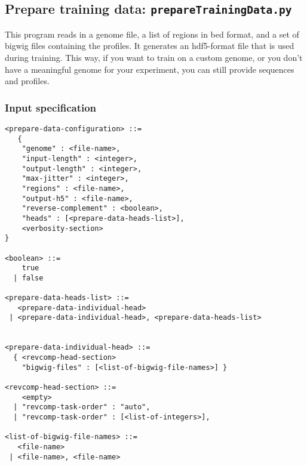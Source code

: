 \documentclass{article}
\begin{document}
\newpage
\subsection{Prepare training data: \texttt{prepareTrainingData.py}}

This program reads in a genome file, a list of regions in bed format, and a set of bigwig files containing the profiles. 
It generates an hdf5-format file that is used during training. 
This way, if you want to train on a custom genome, or you don't have a meaningful genome for your experiment, you can still provide sequences and profiles. 

\subsubsection{Input specification}

\begin{lstlisting}
<prepare-data-configuration> ::=
   {
    "genome" : <file-name>,
    "input-length" : <integer>,
    "output-length" : <integer>,
    "max-jitter" : <integer>,
    "regions" : <file-name>,
    "output-h5" : <file-name>,
    "reverse-complement" : <boolean>,
    "heads" : [<prepare-data-heads-list>],
    <verbosity-section>
}

<boolean> ::=
    true
  | false

<prepare-data-heads-list> ::=
   <prepare-data-individual-head>
 | <prepare-data-individual-head>, <prepare-data-heads-list>


<prepare-data-individual-head> ::=
  { <revcomp-head-section>
    "bigwig-files" : [<list-of-bigwig-file-names>] }

<revcomp-head-section> ::= 
    <empty>
  | "revcomp-task-order" : "auto",
  | "revcomp-task-order" : [<list-of-integers>],

<list-of-bigwig-file-names> ::= 
   <file-name>
 | <file-name>, <file-name>

\end{lstlisting}
\end{document}

